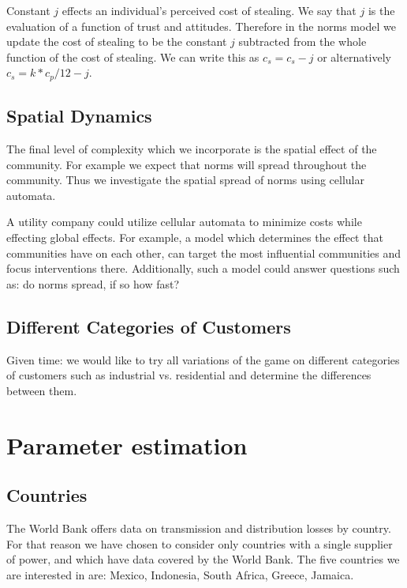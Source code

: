 \documentclass{article}
\begin{document}
Constant $j$ effects an individual's perceived cost of stealing. We say that $j$ is the evaluation of a function of trust and attitudes. Therefore in the norms model we update the cost of stealing to be the constant $j$ subtracted from the whole function of the cost of stealing. We can write this as $c_s=c_s-j$ or alternatively
 $c_s=k*c_p/12 - j$.
                                                                                                                                                                                                                                           \\

\subsection{Spatial Dynamics}
The final level of complexity which we incorporate is the spatial effect of the community. For example we expect that norms will spread throughout the community. Thus we investigate the spatial spread of norms using cellular automata. 

A utility company could utilize cellular automata to minimize costs while effecting global effects. For example, a model which determines the effect that communities have on each other, can target the most influential communities and focus interventions there. Additionally, such a model could answer questions such as: do norms spread, if so how fast?


\subsection{Different Categories of Customers}
Given time: we would like to try all variations of the game on different categories of customers such as industrial vs. residential and determine the differences between them.  

\section{Parameter estimation}

\subsection{Countries}
The World Bank offers data on transmission and distribution losses by country. For that reason we have chosen to consider only countries with a single supplier of power, and which have data covered by the World Bank.  The five countries we are interested in are: Mexico, Indonesia, South Africa, Greece, Jamaica. 
\end{document}

